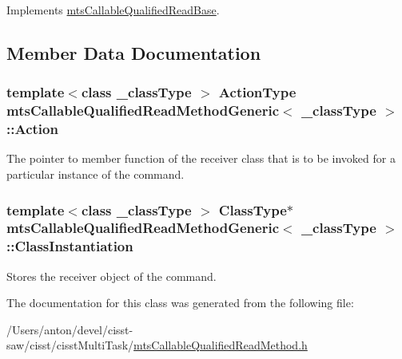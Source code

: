 Implements \hyperlink{classmts_callable_qualified_read_base_af01602ea4eb94bf074f6e44ff3db2737}{mts\+Callable\+Qualified\+Read\+Base}.



\subsection{Member Data Documentation}
\hypertarget{classmts_callable_qualified_read_method_generic_a39b88372b35325f8ed51a406e42b9c51}{}
\subsubsection[{Action}]{\setlength{\rightskip}{0pt plus 5cm}template$<$class \+\_\+class\+Type $>$ {\bf Action\+Type} {\bf mts\+Callable\+Qualified\+Read\+Method\+Generic}$<$ \+\_\+class\+Type $>$\+::Action\hspace{0.3cm}{\ttfamily [protected]}}\label{classmts_callable_qualified_read_method_generic_a39b88372b35325f8ed51a406e42b9c51}
The pointer to member function of the receiver class that is to be invoked for a particular instance of the command. \hypertarget{classmts_callable_qualified_read_method_generic_aa2cc99ad37b816f02a8287a26e3f22b0}{}
\subsubsection[{Class\+Instantiation}]{\setlength{\rightskip}{0pt plus 5cm}template$<$class \+\_\+class\+Type $>$ {\bf Class\+Type}$\ast$ {\bf mts\+Callable\+Qualified\+Read\+Method\+Generic}$<$ \+\_\+class\+Type $>$\+::Class\+Instantiation\hspace{0.3cm}{\ttfamily [protected]}}\label{classmts_callable_qualified_read_method_generic_aa2cc99ad37b816f02a8287a26e3f22b0}
Stores the receiver object of the command. 

The documentation for this class was generated from the following file\+:\begin{DoxyCompactItemize}
\item 
/\+Users/anton/devel/cisst-\/saw/cisst/cisst\+Multi\+Task/\hyperlink{mts_callable_qualified_read_method_8h}{mts\+Callable\+Qualified\+Read\+Method.\+h}\end{DoxyCompactItemize}
